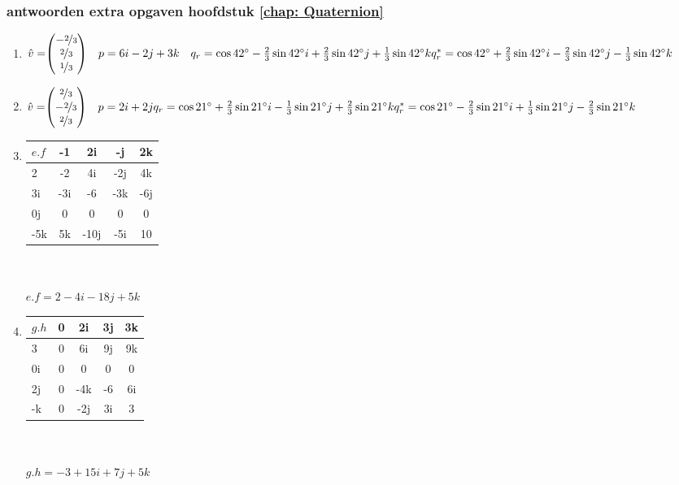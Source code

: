 \subsubsection{antwoorden extra opgaven hoofdstuk \ref{chap: Quaternion}}
\begin{enumerate}
	\item 
	$\hat{v} = \vecdrie{-\nicefrac{2}{3}}{\nicefrac{2}{3}}{\nicefrac{1}{3}}
	\quad p  = 6i - 2j + 3k  \\
	\quad q_r  =  \cos 42 \degree  - \frac{2 }{3}\sin 42 \degree i 
	+ \frac{2 }{3}\sin 42 \degree j + \frac{1 }{3}\sin 42 \degree k \\
	q^*_r  =  \cos 42 \degree  + \frac{2 }{3}\sin 42 \degree i 
	- \frac{2 }{3}\sin 42 \degree j - \frac{1 }{3}\sin 42 \degree k $
	
	\item 
	$\hat{v} = \vecdrie{\nicefrac{2}{3}}{- \nicefrac{2}{3}}{\nicefrac{2}{3}}
	\quad p  = 2i + 2j   \\
	q_r  =  \cos 21 \degree  + \frac{2 }{3}\sin 21 \degree i 
	- \frac{1}{3}\sin 21 \degree j
	+ \frac{2 }{3 } \sin 21 \degree k   \\
	q^*_r  =  \cos 21 \degree  - \frac{2 }{3}\sin 21 \degree i 
	+ \frac{1}{3}\sin 21 \degree j
	- \frac{2 }{3 } \sin 21 \degree k $
	
	\item
	\begin{tabular}{ | l || c | c |c |c |}
		\hline
		$ e.f $ &-1 & 2i   & -j & 2k \\ \hline \hline
		2    & -2 & 4i     &  -2j   & 4k  \\ \hline
		3i    & -3i & -6  &  -3k   & -6j  \\ \hline
		0j   & 0 &  0 &   0     & 0\\ \hline
		-5k    & 5k  & -10j   & -5i   & 10\\ 
		\hline 
	\end{tabular} \\ \\
	$ e.f = 2  - 4i -18j + 5k $
	
	\item
	\begin{tabular}{ | l || c | c |c |c |}
		\hline
		$ g.h $ & 0 & 2i  & 3j       & 3k \\ \hline \hline
		3          & 0 & 6i   &   9j    & 9k  \\ \hline
		0i         & 0 & 0   &   0    & 0 \\ \hline
		2j         & 0 &  -4k  &   -6     & 6i\\ \hline
		-k         & 0  & -2j  & 3i      & 3\\ 
		\hline 
	\end{tabular} \\ \\
	$ g.h = -3 +15i + 7j + 5k $
	

\end{enumerate}
